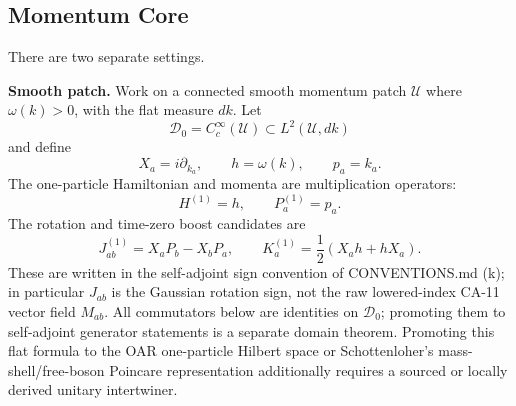 
\subsection{Momentum Core}

There are two separate settings.

\textbf{Smooth patch.}  Work on a connected smooth momentum patch \(\mathcal U\) where
\(\omega(k)>0\), with the flat measure \(dk\).  Let
\[
  \mathcal D_0=C_c^\infty(\mathcal U)\subset L^2(\mathcal U,dk)
\]
and define
\[
  X_a=i\partial_{k_a},
  \qquad
  h=\omega(k),
  \qquad
  p_a=k_a .
\]
The one-particle Hamiltonian and momenta are multiplication operators:
\[
  H^{(1)}=h,\qquad P_a^{(1)}=p_a.
\]
The rotation and time-zero boost candidates are
\[
  J_{ab}^{(1)}=X_aP_b-X_bP_a,
  \qquad
  K_a^{(1)}=\frac{1}{2}(X_ah+hX_a).
\]
These are written in the self-adjoint sign convention of CONVENTIONS.md (k);
in particular \(J_{ab}\) is the Gaussian rotation sign, not the raw lowered-index
CA-11 vector field \(M_{ab}\).
All commutators below are identities on \(\mathcal D_0\); promoting them to
self-adjoint generator statements is a separate domain theorem.  Promoting this
flat formula to the OAR one-particle Hilbert space or Schottenloher's
mass-shell/free-boson Poincare representation additionally requires a sourced
or locally derived unitary intertwiner.

